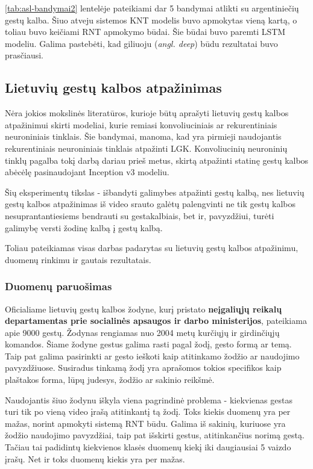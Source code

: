 \documentclass{VUMIFPSbakalaurinis}
\begin{document}
\ref{tab:asl-bandymai2} lentelėje pateikiami dar 5 bandymai atlikti su argentiniečių gestų kalba. Šiuo atveju sistemos KNT modelis buvo apmokytas vieną kartą, o toliau buvo keičiami RNT apmokymo būdai. Šie būdai buvo paremti LSTM modeliu. Galima pastebėti, kad giliuoju (\textit{angl. deep}) būdu rezultatai buvo prasčiausi. 

\subsection{Lietuvių gestų kalbos atpažinimas}

Nėra jokios mokslinės literatūros, kurioje būtų aprašyti lietuvių gestų kalbos atpažinimui skirti modeliai, kurie remiasi konvoliuciniais ar rekurentiniais neuroniniais tinklais. Šie bandymai, manoma, kad yra pirmieji naudojantis rekurentiniais neuroniniais tinklais atpažinti LGK. Konvoliucinių neuroninių tinklų pagalba tokį darbą dariau prieš metus, skirtą atpažinti statinę gestų kalbos abėcėlę pasinaudojant Inception v3 modeliu.

Šių eksperimentų tikslas - išbandyti galimybes atpažinti gestų kalbą, nes lietuvių gestų kalbos atpažinimas iš video srauto galėtų palengvinti ne tik gestų kalbos nesuprantantiesiems bendrauti su gestakalbiais, bet ir, pavyzdžiui, turėti galimybę versti žodinę kalbą į gestų kalbą. 

Toliau pateikiamas visas darbas padarytas su lietuvių gestų kalbos atpažinimu, duomenų rinkimu ir gautais rezultatais.

\subsubsection{Duomenų paruošimas}
Oficialiame lietuvių gestų kalbos žodyne, kurį pristato \textbf{neįgaliųjų reikalų departamentas prie socialinės apsaugos ir darbo ministerijos}, pateikiama apie 9000 gestų. Žodynas rengiamas nuo 2004 metų kurčiųjų ir girdinčiųjų komandos. Šiame žodyne gestus galima rasti pagal žodį, gesto formą ar temą. Taip pat galima pasirinkti ar gesto ieškoti kaip atitinkamo žodžio ar naudojimo pavyzdžiuose. Susiradus tinkamą žodį yra aprašomos tokios specifikos kaip plaštakos forma, lūpų judesys, žodžio ar sakinio reikšmė. 

Naudojantis šiuo žodynu iškyla viena pagrindinė problema - kiekvienas gestas turi tik po vieną video įrašą atitinkantį tą žodį. Toks kiekis duomenų yra per mažas, norint apmokyti sistemą RNT būdu. Galima iš sakinių, kuriuose yra žodžio naudojimo pavyzdžiai, taip pat išskirti gestus, atitinkančius norimą gestą. Tačiau tai padidintų kiekvienos klasės duomenų kiekį iki daugiausiai 5 vaizdo įrašų. Net ir toks duomenų kiekis yra per mažas.
\end{document}
